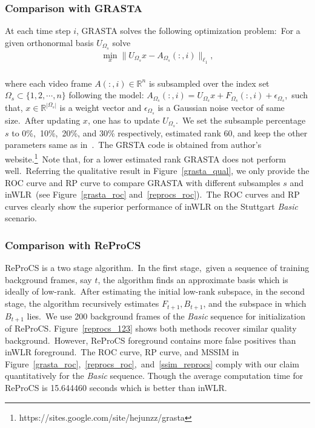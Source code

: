 \documentclass[10pt,twocolumn,letterpaper]{article}
\begin{document}
\subsubsection{Comparison with GRASTA~\cite{grasta}}
\vspace{-0.01in}
At each time step $i$, GRASTA solves the following optimization problem:~For a given orthonormal basis $U_{\Omega_s}$ solve
~\\[-0.27in]
\begin{align}\label{Grasta}
\min_x\|U_{\Omega_s}x-A_{\Omega_s}(:,i)\|_{\ell_1},
\end{align}
~\\[-0.23in]
where each video frame $A(:,i)\in\mathbb{R}^n$ is subsampled over the index set ${\Omega_s}\subset\{1,2,\cdots,n\}$ following the model: $A_{\Omega_s}(:,i)=U_{\Omega_s}x+F_{\Omega_s}(:,i)+\epsilon_{\Omega_s}$,~such that, $x\in\mathbb{R}^{|{\Omega_s}|}$ is a weight vector and $\epsilon_{\Omega_s}$ is a Gaussian noise vector of same size.~After updating $x$, one has to update $U_{\Omega_s}$.~We set the subsample percentage $s$ to 0\%,~10\%,~20\%, and 30\% respectively, estimated rank 60, and keep the other parameters same as in~\cite{grasta}.~The GRSTA code is obtained from author's website.\footnote{ https://sites.google.com/site/hejunzz/grasta}~Note that, for a lower estimated rank GRASTA does not perform well.~Referring the qualitative result in Figure~\ref{grasta_qual}, we only provide the ROC curve and RP curve to compare GRASTA with different subsamples $s$ and inWLR~(see Figure~\ref{grasta_roc} and~\ref{reprocs_roc}).~The ROC curves and RP curves clearly show the superior performance of inWLR on the Stuttgart {\it Basic} scenario.

\vspace{-0.in}
\subsubsection{Comparison with ReProCS~\cite{reprocs}}
\vspace{-0.0in}
ReProCS is a two stage algorithm.~In the first stage,~given a sequence of training background frames, say $t$, the algorithm finds an approximate basis which is ideally of low-rank.~After estimating the initial low-rank subspace, in the second stage, the algorithm recursively estimates $F_{t+1}, B_{t+1}$, and the subspace in which $B_{t+1}$ lies.~We use 200 background frames of the {\it Basic} sequence for initialization of ReProCS. Figure~\ref{reprocs_123} shows both methods recover similar quality background.~However, ReProCS foreground contains more false positives than inWLR foreground.~The ROC curve, RP curve, and MSSIM in Figure~\ref{grasta_roc},~\ref{reprocs_roc},~and~\ref{ssim_reprocs} comply with our claim quantitatively for the {\it Basic} sequence. Though the average computation time for ReProCS is 15.644460 seconds which is better than inWLR.
\vspace{-0.0in}
\end{document}

